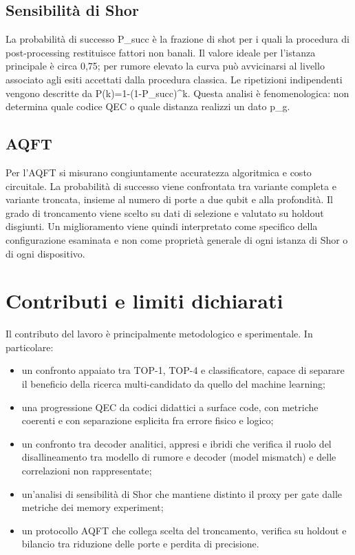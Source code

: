 \subsection{Sensibilità di Shor}\label{sec:finale_2_6_4}

La probabilità di successo P\_succ è la frazione di shot per i quali la procedura di post-processing restituisce fattori non banali. Il valore ideale per l'istanza principale è circa 0,75; per rumore elevato la curva può avvicinarsi al livello associato agli esiti accettati dalla procedura classica. Le ripetizioni indipendenti vengono descritte da P(k)=1-(1-P\_succ)\^{}k. Questa analisi è fenomenologica: non determina quale codice QEC o quale distanza realizzi un dato p\_g.

\subsection{AQFT}\label{sec:finale_2_6_5}

Per l'AQFT si misurano congiuntamente accuratezza algoritmica e costo circuitale. La probabilità di successo viene confrontata tra variante completa e variante troncata, insieme al numero di porte a due qubit e alla profondità. Il grado di troncamento viene scelto su dati di selezione e valutato su holdout disgiunti. Un miglioramento viene quindi interpretato come specifico della configurazione esaminata e non come proprietà generale di ogni istanza di Shor o di ogni dispositivo. \cite{barencoAQFT1996,akoramurthy2026}

\section{Contributi e limiti dichiarati}\label{sec:finale_2_7}\label{sec:contributo_originale}

Il contributo del lavoro è principalmente metodologico e sperimentale. In particolare:

\begin{itemize}
\item
  un confronto appaiato tra TOP-1, TOP-4 e classificatore, capace di separare il beneficio della ricerca multi-candidato da quello del machine learning;
\item
  una progressione QEC da codici didattici a surface code, con metriche coerenti e con separazione esplicita fra errore fisico e logico;
\item
  un confronto tra decoder analitici, appresi e ibridi che verifica il ruolo del disallineamento tra modello di rumore e decoder (model mismatch) e delle correlazioni non rappresentate;
\item
  un'analisi di sensibilità di Shor che mantiene distinto il proxy per gate dalle metriche dei memory experiment;
\item
  un protocollo AQFT che collega scelta del troncamento, verifica su holdout e bilancio tra riduzione delle porte e perdita di precisione.
\end{itemize}

